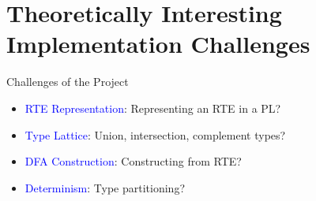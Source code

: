 \section{Theoretically Interesting Implementation Challenges}

{  %
\begin{frame}{Challenges of the Project}
  \begin{itemize}
  \item {} \textcolor{blue}{RTE Representation}:   Representing an RTE in a PL?
  \item {} \textcolor{blue}{Type Lattice}: Union, intersection, complement types?
  \item {} \textcolor{blue}{DFA Construction}:  Constructing from RTE?
  \item {} \textcolor{blue}{Determinism}: Type partitioning?
  \end{itemize}
\end{frame}
}


